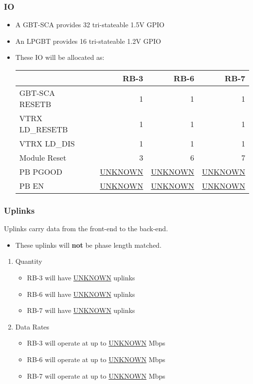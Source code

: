 \documentclass[11pt]{article}
\begin{document}
\subsubsection{IO}
\label{sec:orga85a5b8}
\begin{itemize}
\item A GBT-SCA provides 32 tri-stateable 1.5V GPIO
\item An LPGBT provides 16 tri-stateable 1.2V GPIO
\item These IO will be allocated as:
\begin{center}
\begin{tabular}{llrrr}
 &  & RB-3 & RB-6 & RB-7\\
\hline
GBT-SCA RESETB &  & 1 & 1 & 1\\
VTRX LD\_RESETB &  & 1 & 1 & 1\\
VTRX LD\_DIS &  & 1 & 1 & 1\\
Module Reset &  & 3 & 6 & 7\\
PB PGOOD &  & \uline{UNKNOWN} & \uline{UNKNOWN} & \uline{UNKNOWN}\\
PB EN &  & \uline{UNKNOWN} & \uline{UNKNOWN} & \uline{UNKNOWN}\\
\end{tabular}
\end{center}
\end{itemize}

\subsubsection{Uplinks}
\label{sec:orgea420de}

Uplinks carry data from the front-end to the back-end.

\begin{itemize}
\item These uplinks will \textbf{not} be phase length matched.
\end{itemize}

\begin{enumerate}
\item Quantity
\label{sec:org0cc713e}
\begin{itemize}
\item RB-3 will have \uline{UNKNOWN} uplinks
\item RB-6 will have \uline{UNKNOWN} uplinks
\item RB-7 will have \uline{UNKNOWN} uplinks
\end{itemize}
\item Data Rates
\label{sec:org976d9a7}
\begin{itemize}
\item RB-3 will operate at up to \uline{UNKNOWN} Mbps
\item RB-6 will operate at up to \uline{UNKNOWN} Mbps
\item RB-7 will operate at up to \uline{UNKNOWN} Mbps
\end{itemize}
\end{enumerate}
\end{document}
